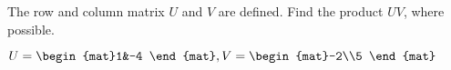
\begin{Exercise}[
name={},
title={}, 
difficulty=0,
origin={\cite{GH}}]
The row and column matrix $U$ and $V$ are defined. Find the product $UV$, where possible.
\begin{multicols}{2}
\Question $U=\begin{mat}1&-4  \end{mat}, \\ V=\begin{mat}-2\\5 \end{mat}$

\end{multicols}
\end{Exercise}
